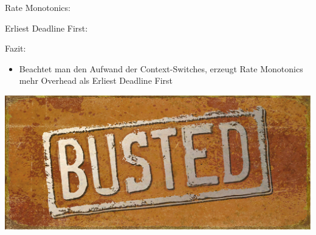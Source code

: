 \begin{frame}{\subsecname}
	Rate Monotonics:
	
	Erliest Deadline First:
	
\end{frame}

\begin{frame}{\subsecname}
	Fazit:
	\begin{itemize}
		\item Beachtet man den Aufwand der Context-Switches, erzeugt Rate Monotonics mehr Overhead als Erliest Deadline First
	\end{itemize}
\end{frame}

\begin{frame}{\subsecname}
	\begin{center}
			\includegraphics[scale=1]{graphics/memes/busted.jpg}
	\end{center}
\end{frame}
